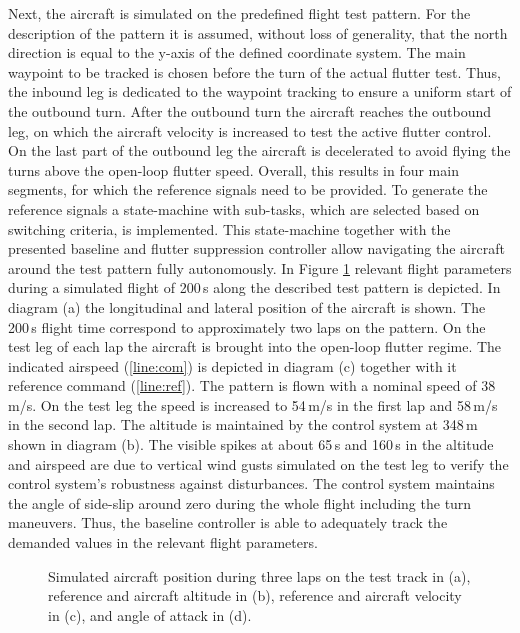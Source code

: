 \documentclass[aerospace,article,submit,moreauthors,pdftex,10pt,a4paper]{Definitions/mdpi}
\begin{document}
\newpage
Next, the aircraft is simulated on the predefined flight test pattern.  For the description of the pattern it is  assumed, without loss of generality, that the north direction is equal to the y-axis of the defined coordinate system. The main waypoint to be tracked is chosen before the turn of the actual flutter test. Thus, the inbound leg is dedicated to the waypoint tracking to ensure a uniform start of the outbound turn. 
After the outbound turn the aircraft reaches the outbound leg, on which the aircraft velocity is increased to test the active flutter control.  On the last part of the outbound leg the aircraft is decelerated to avoid flying the turns above the open-loop flutter speed. Overall, this results in four main segments, for which the reference signals need to be provided. To generate the reference signals  a state-machine with sub-tasks, which are selected based on switching criteria, is implemented.
This state-machine together with the presented baseline and flutter suppression controller allow navigating the aircraft around the test pattern fully autonomously. In Figure \ref{fig:d1_patt_fp} relevant flight parameters during a simulated flight of 200\,s along the described test pattern is depicted. In diagram (a) the longitudinal and lateral position of the aircraft is shown. The 200\,s flight time correspond to approximately two laps on the pattern. On the test leg of each lap the aircraft is brought into the open-loop flutter regime. The  indicated airspeed (\ref{line:com}) is depicted in diagram (c) together with it reference command (\ref{line:ref}). The pattern is flown with a nominal speed of 38\,m/s. On the test leg the speed is increased to 54\,m/s in the first lap and 58\,m/s in the second lap. The altitude is maintained by the control system at 348\,m shown in diagram (b). The visible spikes at about 65\,s and 160\,s in the altitude and airspeed are due to vertical wind gusts simulated on the test leg to verify the control system's robustness  against disturbances. The control system maintains the angle of side-slip around zero during the whole flight including the turn maneuvers. Thus, the baseline controller is able to adequately track the demanded values in the relevant flight parameters.
\begin{figure}[h!]
	\centering
	
	\caption{Simulated aircraft position during three laps on the test track in (a), reference and aircraft altitude in (b), reference and aircraft velocity in (c), and angle of attack in (d).}
	\label{fig:d1_patt_fp}	
\end{figure}
\end{document}
